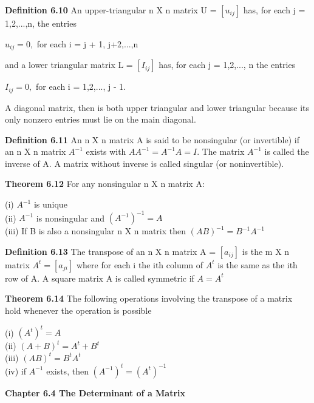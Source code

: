 \documentclass{article}
\begin{document}
\textbf {Definition 6.10} An upper-triangular n X n matrix U = $[u_{ij}]$ has, for each j = 1,2,...,n, the entries
\begin{center}
$u_{ij} = 0,$ for each i = j + 1, j+2,...,n
\end{center}

and a lower triangular matrix L = $[I_{ij}]$ has, for each j = 1,2,..., n the entries
\begin{center}
$I_{ij} = 0,$ for each i = 1,2,..., j - 1.
\end{center}
A diagonal matrix, then is both upper triangular and lower triangular because its only nonzero entries must lie on the main diagonal.

\textbf {Definition 6.11} An n X n matrix A is said to be nonsingular (or invertible) if an n X n matrix $A^{-1}$ exists with $AA^{-1} = A^{-1} A = I$. The matrix $A^{-1}$ is called the inverse of A. A matrix without inverse is called singular (or noninvertible).

\textbf {Theorem 6.12} For any nonsingular n X n matrix A:
\begin{center}
(i) $A^{-1}$ is unique \\
(ii) $A^{-1}$ is nonsingular and $(A^{-1})^{-1} = A$ \\
(iii) If B is also a nonsingular n X n matrix then $(AB)^{-1} = B^{-1} A^{-1}$
\end{center}

\textbf {Definition 6.13} The transpose of an n X n matrix A = $[a_{ij}]$ is the m X n matrix $A^{t} = [a_{ji}]$ where for each i the ith column of $A^{t}$ is the same as the ith row of A. A square matrix A is called symmetric if $A = A^{t}$

\textbf {Theorem 6.14} The following operations involving the transpose of a matrix hold whenever the operation is possible
\begin{center}
(i) $(A^{t})^{t} = A$ \\
(ii) $(A + B)^t = A^t + B^t$ \\
(iii) $(AB)^t = B^t A^t$ \\
(iv) if $A^{-1}$ exists, then $(A^{-1})^t = (A^t)^{-1}$
\end{center}

\textbf {Chapter 6.4 The Determinant of a Matrix}
\end{document}
